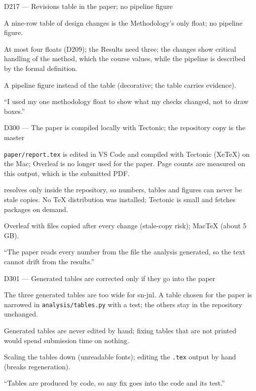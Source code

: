 \documentclass[11pt,a4paper]{report}
\begin{document}
\begin{decisionbox}{D217 --- Revisions table in the paper; no pipeline figure}
\begin{description}[nosep, leftmargin=0pt]
  \item[Decision.] A nine-row table of design changes is the Methodology's only float; no pipeline figure.
  \item[Why.] At most four floats (D209); the Results need three; the changes show critical handling of the method, which the course values, while the pipeline is described by the formal definition.
  \item[Alternatives.] A pipeline figure instead of the table (decorative; the table carries evidence).
  \item[Interview line.] ``I used my one methodology float to show what my checks changed, not to draw boxes.''
\end{description}
\end{decisionbox}
\begin{decisionbox}{D300 --- The paper is compiled locally with Tectonic; the repository copy is the master}
\begin{description}[nosep, leftmargin=0pt]
  \item[Decision.] \texttt{paper/report.tex} is edited in VS Code and compiled with Tectonic (XeTeX) on the Mac; Overleaf is no longer used for the paper. Page counts are measured on this output, which is the submitted PDF.
  \item[Why.] \verb|| resolves only inside the repository, so numbers, tables and figures can never be stale copies. No TeX distribution was installed; Tectonic is small and fetches packages on demand.
  \item[Alternatives.] Overleaf with files copied after every change (stale-copy risk); MacTeX (about 5\,GB).
  \item[Interview line.] ``The paper reads every number from the file the analysis generated, so the text cannot drift from the results.''
\end{description}
\end{decisionbox}

\begin{decisionbox}{D301 --- Generated tables are corrected only if they go into the paper}
\begin{description}[nosep, leftmargin=0pt]
  \item[Decision.] The three generated tables are too wide for sn-jnl. A table chosen for the paper is narrowed in \texttt{analysis/tables.py} with a test; the others stay in the repository unchanged.
  \item[Why.] Generated tables are never edited by hand; fixing tables that are not printed would spend submission time on nothing.
  \item[Alternatives.] Scaling the tables down (unreadable fonts); editing the \texttt{.tex} output by hand (breaks regeneration).
  \item[Interview line.] ``Tables are produced by code, so any fix goes into the code and its test.''
\end{description}
\end{decisionbox}
\end{document}
